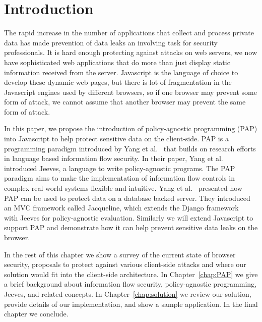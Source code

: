 \chapter{Introduction\label{chap:intro}}

The rapid increase in the number of applications that collect and process private
data has made prevention of data leaks an involving task for security professionals.
It is hard enough protecting against attacks on web servers, we now have sophisticated
web applications that do more than just display static information received from
the server. Javascript is the language of choice to develop these dynamic web pages,
but there is lot of fragmentation in the Javascript engines used by different browsers,
so if one browser may prevent some form of attack, we cannot assume that another
browser may prevent the same form of attack.

In this paper, we propose the introduction of policy-agnostic programming (PAP)
into Javascript to help protect sensitive data on the client-side. PAP is a
programming paradigm introduced by Yang et al.~\cite{Jeeves} that builds on
research efforts in language based information flow security. In their paper,
Yang et al. introduced Jeeves, a language to write policy-agnostic programs. The
PAP paradigm aims to make the implementation of information flow controls in complex
real world systems flexible and intuitive. Yang et al.~\cite{Jacqueline} presented
how PAP can be used to protect data on a database backed server. They introduced
an MVC framework called Jacqueline, which extends the Django framework~\cite{django}
with Jeeves for policy-agnostic evaluation. Similarly we will extend Javascript
to support PAP and demonstrate how it can help prevent sensitive data leaks on the
browser.

In the rest of this chapter we show a survey of the current state of browser security,
proposals to protect against various client-side attacks and where our solution
would fit into the client-side architecture. In Chapter~\ref{chap:PAP} we give a brief background
about information flow security, policy-agnostic programming, Jeeves, and related
concepts. In Chapter~\ref{chap:solution} we review our solution, provide details
of our implementation, and show a sample application. In the final chapter we conclude.

